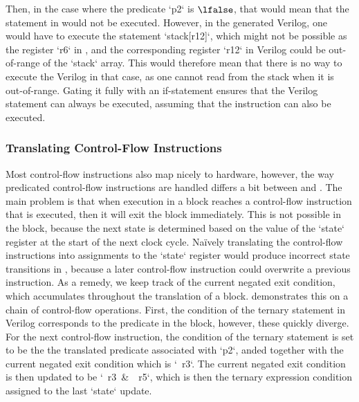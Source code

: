 Then, in the case where the predicate \rtlinline`p2` is $\lfalse$, that would
mean that the statement in \rtlsubpar{} would not be executed.  However, in the
generated Verilog, one would have to execute the statement
\veriloginline`stack[r12]`, which might not be possible as the register
\rtlinline`r6` in \rtlsubpar{}, and the corresponding register
\veriloginline`r12` in Verilog could be out-of-range of the
\veriloginline`stack` array.  This would therefore mean that there is no way to
execute the Verilog in that case, as one cannot read from the stack when it is
out-of-range.  Gating it fully with an if-statement ensures that the Verilog
statement can always be executed, assuming that the \rtlsubpar{} instruction can
also be executed.

\subsubsection{Translating Control-Flow Instructions}%
\label{sec:hg:translating-control-flow-instructions}

Most control-flow instructions also map nicely to hardware, however, the way
predicated control-flow instructions are handled differs a bit between
\rtlsubpar{} and \htl{}.  The main problem is that when execution in a
\rtlsubpar{} block reaches a control-flow instruction that is executed, then it
will exit the block immediately.  This is not possible in the \htl{} block,
because the next state is determined based on the value of the
\veriloginline`state` register at the start of the next clock cycle.  Na\"ively
translating the control-flow instructions into assignments to the
\veriloginline`state` register would produce incorrect state transitions in
\htl{}, because a later control-flow instruction could overwrite a previous
instruction.  As a remedy, we keep track of the current negated exit condition,
which accumulates throughout the translation of a block.
 demonstrates this on a chain of control-flow
operations.  First, the condition of the ternary statement in Verilog
corresponds to the predicate in the block, however, these quickly diverge.  For
the next control-flow instruction, the condition of the ternary statement is set
to be the the translated predicate associated with \rtlinline`p2`, anded
together with the current negated exit condition which is \veriloginline`~r3`.
The current negated exit condition is then updated to be
\veriloginline`~r3 & ~r5`, which is then the ternary expression condition
assigned to the last \veriloginline`state` update.

